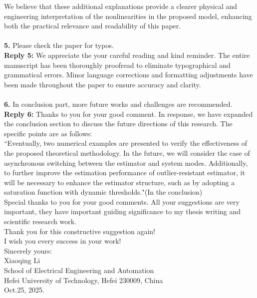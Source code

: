 \documentclass[14pt,fleqn]{article}
\begin{document}
We believe that these additional explanations provide a clearer physical and engineering interpretation of the nonlinearities in the proposed model, enhancing both the practical relevance and readability of this paper.
~\\
\\	
\textbf{5.} Please check the paper for typos.
\\[10pt]
\indent \textbf{Reply 5:} We appreciate the your careful reading and kind reminder. The entire manuscript has been thoroughly proofread to eliminate typographical and grammatical errors. Minor language corrections and formatting adjustments have been made throughout the paper to ensure accuracy and clarity.
~\\
\\
\textbf{6.} In conclusion part, more future works and challenges are recommended.
\\[10pt]
\indent \textbf{Reply 6:} Thanks to you for your good comment. In response, we have expanded the conclusion section to discuss the future directions of this research. The specific points are as follows: \\


``Eventually, two numerical examples are presented to verify the effectiveness of the proposed theoretical methodology. {\color{red}In the future, we will consider the case of asynchronous switching between the estimator and system modes. Additionally, to further improve the estimation performance of outlier-resistant estimator, it will be necessary to enhance the estimator structure, such as by adopting a saturation function with dynamic thresholds.}"(In the conclusion)\\

Special thanks to you for your good comments. All your suggestions are very important, they have important guiding significance to my thesis writing and scientific research work.\\


Thank you for this constructive suggestion again!\\


I wish you every success in your work!\\

Sincerely yours:
\\

\indent Xiaoqing Li\\

School of Electrical Engineering and Automation\\

Hefei University of Technology, Hefei 230009, China\\

\indent Oct.25, 2025.
\end{document}
